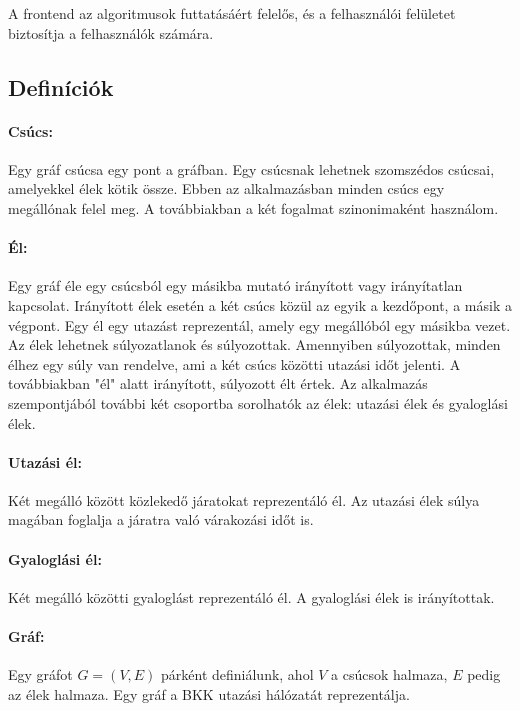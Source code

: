 A frontend az algoritmusok futtatásáért felelős, és a felhasználói felületet biztosítja a felhasználók számára.

\subsection{Definíciók}

\paragraph{Csúcs:} Egy gráf csúcsa egy pont a gráfban. Egy csúcsnak lehetnek szomszédos csúcsai, amelyekkel élek kötik össze. Ebben az alkalmazásban minden csúcs egy megállónak felel meg. A továbbiakban a két fogalmat szinonimaként használom.

\paragraph{Él:} Egy gráf éle egy csúcsból egy másikba mutató irányított vagy irányítatlan kapcsolat. Irányított élek esetén a két csúcs közül az egyik a kezdőpont, a másik a végpont. Egy él egy utazást reprezentál, amely egy megállóból egy másikba vezet. Az élek lehetnek súlyozatlanok és súlyozottak. Amennyiben súlyozottak, minden élhez egy súly van rendelve, ami a két csúcs közötti utazási időt jelenti. A továbbiakban "él" alatt irányított, súlyozott élt értek. Az alkalmazás szempontjából további két csoportba sorolhatók az élek: utazási élek és gyaloglási élek.

\paragraph{Utazási él:} Két megálló között közlekedő járatokat reprezentáló él. Az utazási élek súlya magában foglalja a járatra való várakozási időt is.

\paragraph{Gyaloglási él:} Két megálló közötti gyaloglást reprezentáló él. A gyaloglási élek is irányítottak.

\paragraph{Gráf:} Egy gráfot $G = (V, E)$ párként definiálunk, ahol $V$ a csúcsok halmaza, $E$ pedig az élek halmaza. Egy gráf a BKK utazási hálózatát reprezentálja.

